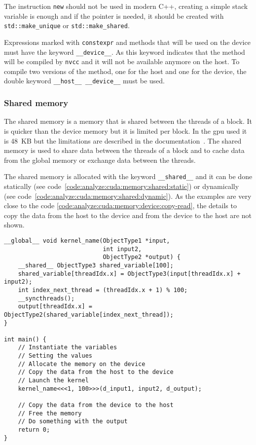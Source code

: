 The instruction \texttt{new} should not be used in modern C++, creating a simple
stack variable is enough and if the pointer is needed, it should be created with
\texttt{std::make\_unique} or \texttt{std::make\_shared}.

Expressions marked with \texttt{constexpr} and methods that will be used on the device must have the
keyword \texttt{\_\_device\_\_}.
As this keyword indicates that the method will be compiled by \texttt{nvcc} and
it will not be available anymore on the host.
To compile two versions of the method, one for the host and one for the device,
the double keyword \texttt{\_\_host\_\_ \_\_device\_\_} must be used.


\subsubsection{Shared memory}
\label{ch:analyze:cuda:memory:shared}

The shared memory is a memory that is shared between the threads of a block.
It is quicker than the device memory but it is limited per block.
In the \acrshort{gpu} used it is 48~KB but the limitations are described in the
documentation~\cite{cuda-capability}.
The shared memory is used to share data between the threads of a block and to
cache data from the global memory or exchange data between the threads.

The shared memory is allocated with the keyword \texttt{\_\_shared\_\_} and it
can be done statically (see code~\ref{code:analyze:cuda:memory:shared:static}) or
dynamically (see code~\ref{code:analyze:cuda:memory:shared:dynamic}).
As the examples are very close to the code \ref{code:analyze:cuda:memory:device:copy-read},
the details to copy the data from the host to the device and from the device to
the host are not shown.

\begin{code}
    \label{code:analyze:cuda:memory:shared:static}
    \begin{verbatim}
__global__ void kernel_name(ObjectType1 *input,
                            int input2,
                            ObjectType2 *output) {
    __shared__ ObjectType3 shared_variable[100];
    shared_variable[threadIdx.x] = ObjectType3(input[threadIdx.x] + input2);
    int index_next_thread = (threadIdx.x + 1) % 100;
    __syncthreads();
    output[threadIdx.x] = ObjectType2(shared_variable[index_next_thread]);
}

int main() {
    // Instantiate the variables
    // Setting the values
    // Allocate the memory on the device
    // Copy the data from the host to the device
    // Launch the kernel
    kernel_name<<<1, 100>>>(d_input1, input2, d_output);

    // Copy the data from the device to the host
    // Free the memory
    // Do something with the output
    return 0;
}
    \end{verbatim}
\end{code}

